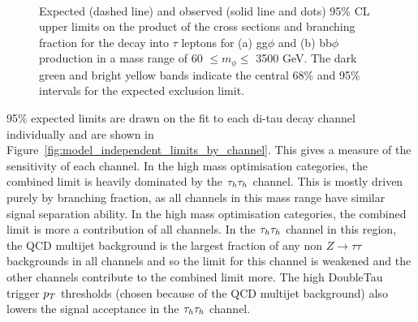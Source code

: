 \begin{figure}[!hbtp]
\centering
     \\
\caption{Expected (dashed line) and observed (solid line and dots) 95\% CL upper limits on the product of the cross sections and branching fraction for the decay into $\tau$ leptons for (a) gg$\phi$ and (b) bb$\phi$ production in a mass range of 60 $\leq m_{\phi} \leq$ 3500 GeV.  The dark green and bright yellow bands indicate the central 68\% and 95\% intervals for the expected exclusion limit.}
\label{fig:model_independent_limits}
\end{figure}

95\% expected limits are drawn on the fit to each di-tau decay channel individually and are shown in Figure~\ref{fig:model_independent_limits_by_channel}.
This gives a measure of the sensitivity of each channel.
In the high mass optimisation categories, the combined limit is heavily dominated by the $\tau_{h}\tau_{h}$ channel.
This is mostly driven purely by branching fraction, as all channels in this mass range have similar signal separation ability.
In the high mass optimisation categories,  the combined limit is more a contribution of all channels. 
In the $\tau_{h}\tau_{h}$ channel in this region, the QCD multijet background is the largest fraction of any non $Z\rightarrow\tau\tau$ backgrounds in all channels and so the limit for this channel is weakened and the other channels contribute to the combined limit more.
The high DoubleTau trigger $p_{T}$ thresholds (chosen because of the QCD multijet background) also lowers the signal acceptance in the $\tau_{h}\tau_{h}$ channel. \\

